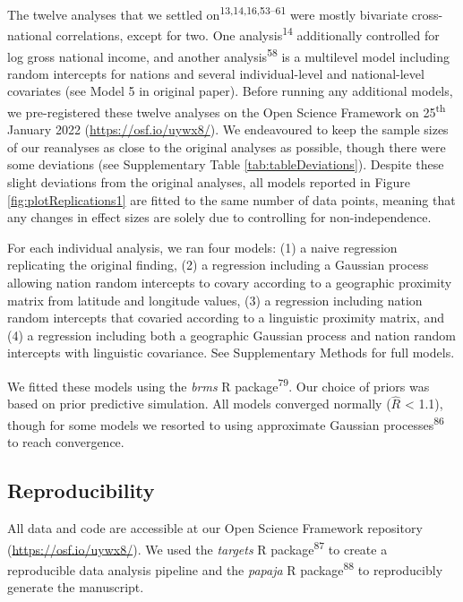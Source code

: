 \documentclass[
  man,floatsintext]{apa6}
\begin{document}
The twelve analyses that we settled on\textsuperscript{13,14,16,53--61} were mostly bivariate cross-national correlations, except for two. One analysis\textsuperscript{14} additionally controlled for log gross national income, and another analysis\textsuperscript{58} is a multilevel model including random intercepts for nations and several individual-level and national-level covariates (see Model 5 in original paper). Before running any additional models, we pre-registered these twelve analyses on the Open Science Framework on 25\textsuperscript{th} January 2022 (\url{https://osf.io/uywx8/}). We endeavoured to keep the sample sizes of our reanalyses as close to the original analyses as possible, though there were some deviations (see Supplementary Table \ref{tab:tableDeviations}). Despite these slight deviations from the original analyses, all models reported in Figure \ref{fig:plotReplications1} are fitted to the same number of data points, meaning that any changes in effect sizes are solely due to controlling for non-independence.

For each individual analysis, we ran four models: (1) a naive regression replicating the original finding, (2) a regression including a Gaussian process allowing nation random intercepts to covary according to a geographic proximity matrix from latitude and longitude values, (3) a regression including nation random intercepts that covaried according to a linguistic proximity matrix, and (4) a regression including both a geographic Gaussian process and nation random intercepts with linguistic covariance. See Supplementary Methods for full models.

We fitted these models using the \emph{brms} R package\textsuperscript{79}. Our choice of priors was based on prior predictive simulation. All models converged normally (\(\hat{R}\) \textless{} 1.1), though for some models we resorted to using approximate Gaussian processes\textsuperscript{86} to reach convergence.

\hypertarget{reproducibility}{%
\subsection{Reproducibility}\label{reproducibility}}

All data and code are accessible at our Open Science Framework repository (\url{https://osf.io/uywx8/}). We used the \emph{targets} R package\textsuperscript{87} to create a reproducible data analysis pipeline and the \emph{papaja} R package\textsuperscript{88} to reproducibly generate the manuscript.
\end{document}
